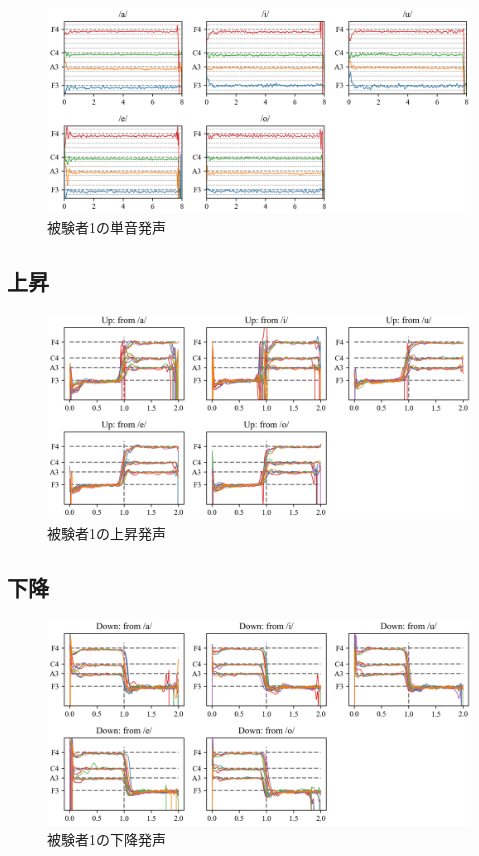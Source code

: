 \documentclass[10.5ptj,a4j,dvipdfmx,uplatex, oneside, openany]{jsbook}%
\begin{document}
\begin{figure}[htbp]
    \begin{center}
      \includegraphics[clip,width=16.0cm]{F0_long_1.png}
      \caption{被験者1の単音発声}
      \label{fig:1}
    \end{center}
\end{figure}

\subsection{上昇}
\begin{figure}[htbp]
    \begin{center}
      \includegraphics[clip,width=16.0cm]{F0_up_1.png}
      \caption{被験者1の上昇発声}
      \label{fig:u1}
    \end{center}
\end{figure}

\subsection{下降}
\begin{figure}[htbp]
    \begin{center}
      \includegraphics[clip,width=16.0cm]{F0_down_1.png}
      \caption{被験者1の下降発声}
      \label{fig:d1}
    \end{center}
\end{figure}
\end{document}
